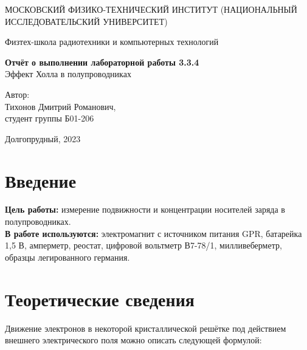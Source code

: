 \documentclass[a4paper, 12pt]{article}
\begin{document}
    \begin{titlepage}
	\begin{center}
            {\large МОСКОВСКИЙ ФИЗИКО-ТЕХНИЧЕСКИЙ ИНСТИТУТ (НАЦИОНАЛЬНЫЙ ИССЛЕДОВАТЕЛЬСКИЙ УНИВЕРСИТЕТ)}
	\end{center}
 
	\begin{center}
		{\large Физтех-школа радиотехники и компьютерных технологий}
	\end{center}
	
	\vspace{8cm}
	{\LARGE
		\begin{center}
                {\bf Отчёт о выполнении лабораторной работы 3.3.4}\\
                Эффект Холла в полупроводниках
		\end{center}
	}
	\vspace{5cm}
	\begin{flushright}
		{\Large Автор:\\ Тихонов Дмитрий Романович, \\
			\vspace{0.2cm}
			студент группы Б01-206}
	\end{flushright}
	\vspace{5cm}
	\begin{center}
		\Large Долгопрудный, 2023
	\end{center}
    \end{titlepage}

    \section{Введение}

    \noindent \textbf{Цель работы:} измерение подвижности и концентрации носителей заряда в полупроводниках. \\

    \noindent \textbf{В работе используются:} электромагнит с источником питания GPR, батарейка 1,5 В, амперметр, реостат, цифровой вольтметр В7-78/1, милливеберметр, образцы легированного германия.
    
    \section{Теоретические сведения}

    Движение электронов в некоторой кристаллической решётке под действием внешнего электрического поля можно описать следующей формулой:
\end{document}
